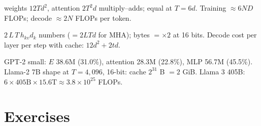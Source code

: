 \documentclass[11pt,letterpaper]{article}
\newcommand{\dk}{d_k}
\begin{document}
\begin{description}[leftmargin=0pt,labelindent=0pt,itemsep=6pt,font=\normalfont\bfseries\sffamily]
\item[Compute per layer, $T$ tokens.] weights $12Td^2$, attention $2T^2d$ multiply--adds; equal at $T=6d$. Training $\approx6ND$ FLOPs; decode $\approx2N$ FLOPs per token.
\item[KV cache.] $2\,L\,T\,h_{kv}\dk$ numbers ($=2LTd$ for MHA); bytes $=\times2$ at 16 bits. Decode cost per layer per step with cache: $12d^2+2td$.
\item[Worked numbers (derived).] GPT-2 small: $E$ 38.6M (31.0\%), attention 28.3M (22.8\%), MLP 56.7M (45.5\%). Llama-2 7B shape at $T=4{,}096$, 16-bit: cache $2^{31}$ B $=2$ GiB. Llama 3 405B: $6\times405\text{B}\times15.6\text{T}\approx3.8\times10^{25}$ FLOPs.
\end{description}

\clearpage
\section{Exercises}
\end{document}
